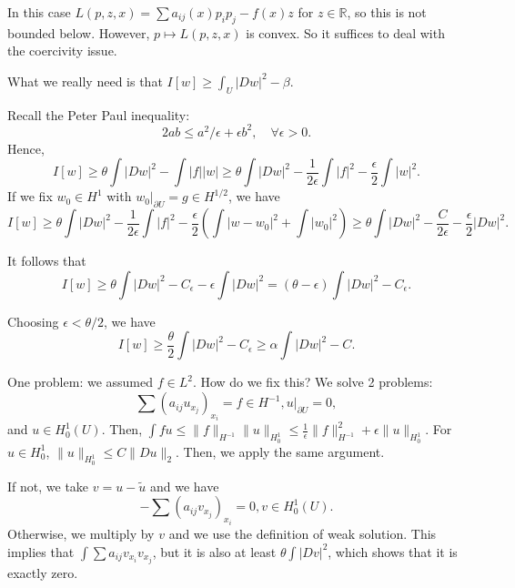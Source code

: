 \documentclass[12pt]{scrartcl}
\newcommand{\R}{\mathbb{R}}
\newcommand{\<}{\langle}
\renewcommand{\>}{\rangle}
\begin{document}
In this case $L(p, z, x) = \sum a_{ij}(x) p_i p_j - f(x)z$ for $z \in\R$, so this is not bounded below.   However, $p \mapsto L(p, z, x)$ is convex.  So it suffices to deal with the coercivity issue.  

What we really need is that $I[w] \ge \int _U |Dw|^2 - \beta$.  

Recall the Peter Paul inequality: 
$$2ab \le a^2/\epsilon + \epsilon b^2, \quad \forall \epsilon > 0.$$
Hence,
$$I[w] \ge \theta \int |Dw|^2 - \int |f| |w| \ge \theta \int |Dw|^2 - \frac{1}{2\epsilon }\int |f|^2 - \frac{\epsilon}{2} \int |w|^2.$$
If we fix $w_0 \in H^1$ with $w_0 \vert_{\partial U} = g \in H^{1/2}$, we have
$$I[w] \ge \theta \int |Dw|^2 - \frac{1}{2\epsilon}\int |f|^2 - \frac{\epsilon}{2}\left ( \int |w - w_0|^2 + \int |w_0|^2\right ) \ge \theta \int |Dw|^2 - \frac{C}{2\epsilon} - \frac{\epsilon}{2} |Dw|^2.$$


It follows that 
$$I[w] \ge \theta \int |Dw|^2 - C_\epsilon - \epsilon \int |Dw|^2 = (\theta - \epsilon) \int |Dw|^2 - C_\epsilon.$$

Choosing $\epsilon < \theta/2$, we have
$$I[w] \ge \frac{\theta}{2} \int |Dw|^2 - C_\epsilon \ge \alpha \int |Dw|^2 - C.$$

One problem: we assumed $f \in L^2$.  How do we fix this? We solve 2 problems:
$$\sum (a_{ij}u_{x_j})_{x_i} = f \in H^{-1}, u \vert_{\partial U} = 0,$$
and $u \in H_0^1(U)$.  Then, $\int fu \le \|f\|_{H^{-1}} \|u\|_{H_0^1} \le \frac{1}{\epsilon} \|f\|_{H^{-1}}^2 + \epsilon \|u\|_{H_0^1}$.  For $u \in H_0^1$, $\|u\|_{H_0^1} \le C \|Du\|_{2}$.  Then, we apply the same argument.

If not, we take $v = u - \tilde{u}$ and we have $$-\sum (a_{ij} v_{x_j})_{x_i} = 0, v\in H_0^1(U).$$  Otherwise, we multiply by $v$ and we use the definition of weak solution.  This implies that $\int \sum a_{ij} v_{x_i}v_{x_j}$, but it is also at least $\theta \int |Dv|^2$, which shows that it is exactly zero.
\end{document}
